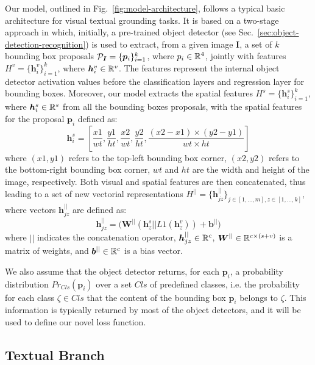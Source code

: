 Our model, outlined in Fig.~\ref{fig:model-architecture}, follows a
typical basic architecture for visual textual grounding tasks. It is
based on a two-stage approach in which, initially, a pre-trained
object detector (see Sec.~\ref{sec:object-detection-recognition}) is
used to extract, from a given image $\bm{I}$, a set of $k$ bounding
box proposals $\mathcal{P}_{\bm{I}} = \{ \bm{p}_i \}^k_{i=1}$, where $p_i
\in \mathbb{R}^4$, jointly with features $H^v = \{ \bm{h}^v_i \}^k_{i=1}$,
where $\bm{h}^v_i \in \mathbb{R}^v$. The features represent the internal
object detector activation values before the classification layers and
regression layer for bounding boxes. Moreover, our model extracts the
spatial features $H^s = \{ \bm{h}^s_i \}^k_{i=1}$, where $\bm{h}^s_i
\in \mathbb{R}^s$ from all the bounding boxes proposals, with the spatial
features for the proposal $\bm{p}_i$ defined as:
\begin{equation}
  \bm{h}^s_i = \left[ \frac{x1}{wt}, \frac{y1}{ht}, \frac{x2}{wt}, \frac{y2}{ht}, \frac{(x2 - x1) \times (y2 - y1)}{wt \times ht}  \right]
\end{equation}
where $(x1, y1)$ refers to the top-left bounding box corner, $(x2,
y2)$ refers to the bottom-right bounding box corner, $wt$ and $ht$ are
the width and height of the image, respectively. Both visual and
spatial features are then concatenated, thus leading to a set of new
vectorial representations $H^{||} = \{ \bm{h}^{||}_{jz} \}_{j \in [1,
\ldots, m], z \in [1, \ldots, k]}$, where vectors $\bm{h}^{||}_{jz}$
are defined as:
\begin{equation}
  \bm{h}^{||}_{jz} = \Big( \bm{W}^{||} \left( \bm{h}^s_z || L1(\bm{h}^v_z) \right) + \bm{b}^{||} \Big) 
\end{equation}
where $||$ indicates the concatenation operator, $\bm{h}^{||}_{jz} \in
\mathbb{R}^c$, $\bm{W}^{||} \in \mathbb{R}^{c \times (s + v)}$ is a matrix
of weights, and $\bm{b}^{||} \in \mathbb{R}^c$ is a bias vector.

We also assume that the object detector returns, for each $\bm{p}_i$,
a probability distribution $Pr_{Cls}(\bm{p}_i)$ over a set $Cls$ of
predefined classes, i.e. the probability for each class $\zeta \in
Cls$ that the content of the bounding box $\bm{p}_i$ belongs to
$\zeta$. This information is typically returned by most of the object
detectors, and it will be used to define our novel loss function.

\subsection{Textual Branch}

